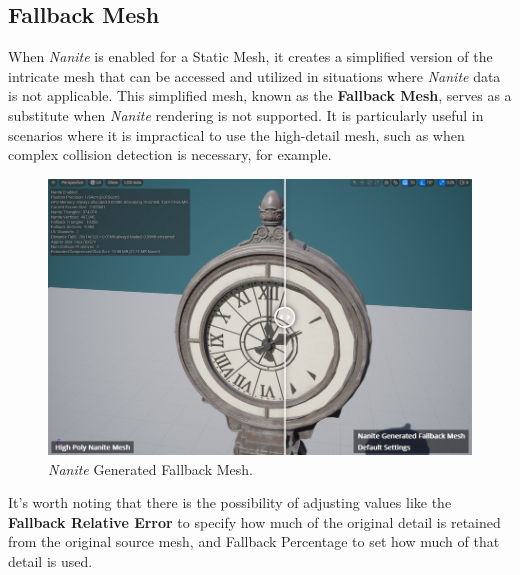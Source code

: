 \documentclass[10pt,journal,compsoc]{IEEEtran}
\begin{document}

\subsection{Fallback Mesh}

\par When \textit{Nanite} is enabled for a Static Mesh, it creates a simplified version of the intricate mesh that can be accessed and utilized in situations where \textit{Nanite} data is not applicable. This simplified mesh, known as the \textbf{Fallback Mesh}, serves as a substitute when \textit{Nanite} rendering is not supported. It is particularly useful in scenarios where it is impractical to use the high-detail mesh, such as when complex collision detection is necessary, for example.

\begin{figure}[H]
    \centering
    \includegraphics[scale=0.37]{img/fallback.png}
    \caption{\textit{Nanite} Generated Fallback Mesh\cite{Unreal}.}
    \label{fig:Fallback}
\end{figure}

\par It's worth noting that there is the possibility of adjusting values like the \textbf{Fallback Relative Error} to specify how much of the original detail is retained from the original source mesh, and Fallback Percentage to set how much of that detail is used.
\end{document}
